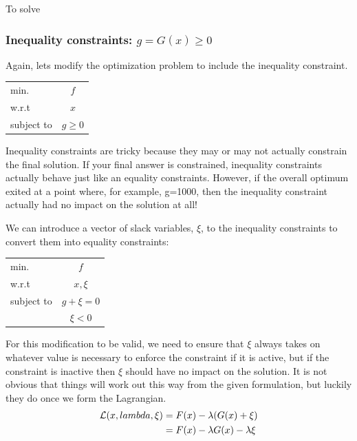 \documentclass[conf]{new-aiaa}
\begin{document}
        To solve 


        \subsubsection{Inequality constraints: $g = G(x) \ge 0$}

        Again, lets modify the optimization problem to include the inequality constraint. 
        \begin{table}[H]
            \centering
            \begin{tabular}{lc}
                \hline
                min. & $f$ \\
                w.r.t & $x$ \\ 
                subject to & $g \ge 0$ \\ \hline 
            \end{tabular}
        \end{table}

        Inequality constraints are tricky because they may or may not actually constrain the final solution. 
        If your final answer is constrained, inequality constraints actually behave just like an equality constraints. 
        However, if the overall optimum exited at a point where, for example, g=1000, then the inequality constraint actually had no impact on the solution at all! 

        We can introduce a vector of slack variables, $\xi$, to the inequality constraints to convert them into equality constraints: 
        \begin{table}[H]
            \centering
            \begin{tabular}{lc}
                \hline
                min. & $f$ \\
                w.r.t & $x, \xi$ \\ 
                subject to & $g + \xi = 0$ \\ 
                           & $\xi < 0$ \\ \hline
            \end{tabular}
        \end{table}
        For this modification to be valid, we need to ensure that $\xi$ always takes on whatever value is necessary to enforce the constraint if it is active, but if the constraint is inactive then $\xi$ should have no impact on the solution. 
        It is not obvious that things will work out this way from the given formulation, but luckily they do once we form the Lagrangian. 
        \begin{align}
            \mathcal{L}(x,lambda,\xi) &= F(x) - \lambda(G(x) + \xi) \notag \\
                               &= F(x) - \lambda G(x) - \lambda \xi \label{eq:L_ineq}
        \end{align}
\end{document}
